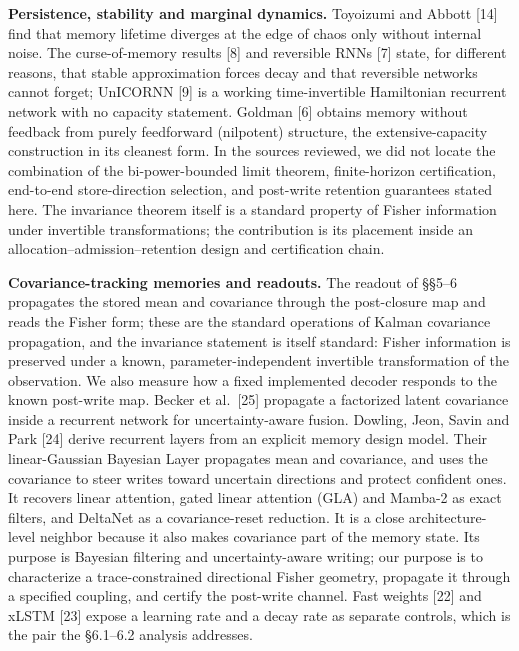 \documentclass[
  10pt,
]{article}
\begin{document}
\textbf{Persistence, stability and marginal dynamics.} Toyoizumi and
Abbott {[}14{]} find that memory lifetime diverges at the edge of chaos
only without internal noise. The curse-of-memory results {[}8{]} and
reversible RNNs {[}7{]} state, for different reasons, that stable
approximation forces decay and that reversible networks cannot forget;
UnICORNN {[}9{]} is a working time-invertible Hamiltonian recurrent
network with no capacity statement. Goldman {[}6{]} obtains memory
without feedback from purely feedforward (nilpotent) structure, the
extensive-capacity construction in its cleanest form. In the sources
reviewed, we did not locate the combination of the bi-power-bounded
limit theorem, finite-horizon certification, end-to-end store-direction
selection, and post-write retention guarantees stated here. The
invariance theorem itself is a standard property of Fisher information
under invertible transformations; the contribution is its placement
inside an allocation--admission--retention design and certification
chain.

\textbf{Covariance-tracking memories and readouts.} The readout of
§§5--6 propagates the stored mean and covariance through the
post-closure map and reads the Fisher form; these are the standard
operations of Kalman covariance propagation, and the invariance
statement is itself standard: Fisher information is preserved under a
known, parameter-independent invertible transformation of the
observation. We also measure how a fixed implemented decoder responds to
the known post-write map. Becker et al.~{[}25{]} propagate a factorized
latent covariance inside a recurrent network for uncertainty-aware
fusion. Dowling, Jeon, Savin and Park {[}24{]} derive recurrent layers
from an explicit memory design model. Their linear-Gaussian Bayesian
Layer propagates mean and covariance, and uses the covariance to steer
writes toward uncertain directions and protect confident ones. It
recovers linear attention, gated linear attention (GLA) and Mamba-2 as
exact filters, and DeltaNet as a covariance-reset reduction. It is a
close architecture-level neighbor because it also makes covariance part
of the memory state. Its purpose is Bayesian filtering and
uncertainty-aware writing; our purpose is to characterize a
trace-constrained directional Fisher geometry, propagate it through a
specified coupling, and certify the post-write channel. Fast weights
{[}22{]} and xLSTM {[}23{]} expose a learning rate and a decay rate as
separate controls, which is the pair the §6.1--6.2 analysis addresses.
\end{document}
